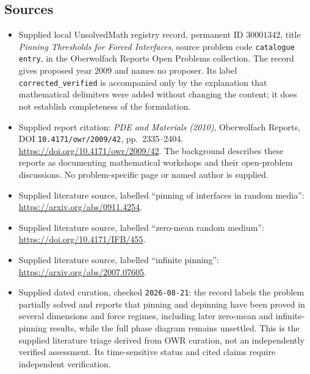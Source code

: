 \documentclass[11pt]{article}
\begin{document}
\subsection{Sources}
\begin{itemize}
\item Supplied local UnsolvedMath registry record, permanent ID \(30001342\), title \emph{Pinning Thresholds for Forced Interfaces}, source problem code \texttt{catalogue entry}, in the Oberwolfach Reports Open Problems collection. The record gives proposed year \(2009\) and names no proposer. Its label \texttt{corrected\_verified} is accompanied only by the explanation that mathematical delimiters were added without changing the content; it does not establish completeness of the formulation.
\item Supplied report citation: \emph{PDE and Materials (2010)}, Oberwolfach Reports, DOI \texttt{10.4171/owr/2009/42}, pp.~2335--2404. \url{https://doi.org/10.4171/owr/2009/42}. The background describes these reports as documenting mathematical workshops and their open-problem discussions. No problem-specific page or named author is supplied.
\item Supplied literature source, labelled ``pinning of interfaces in random media'': \url{https://arxiv.org/abs/0911.4254}.
\item Supplied literature source, labelled ``zero-mean random medium'': \url{https://doi.org/10.4171/IFB/455}.
\item Supplied literature source, labelled ``infinite pinning'': \url{https://arxiv.org/abs/2007.07605}.
\item Supplied dated curation, checked \texttt{2026-08-21}: the record labels the problem partially solved and reports that pinning and depinning have been proved in several dimensions and force regimes, including later zero-mean and infinite-pinning results, while the full phase diagram remains unsettled. This is the supplied literature triage derived from OWR curation, not an independently verified assessment. Its time-sensitive status and cited claims require independent verification.
\end{itemize}
\end{document}

